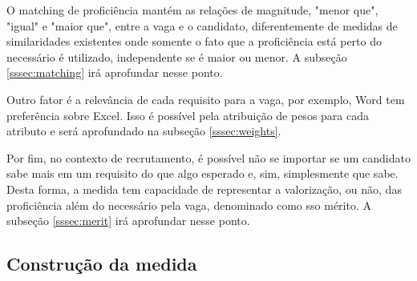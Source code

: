 \documentclass[preprint,12pt]{elsarticle}
\begin{document}
O matching de proficiência mantém as relações de magnitude, "menor que", "igual" e "maior que", entre a vaga e o candidato, diferentemente de medidas de similaridades existentes onde somente o fato que a proficiência está perto do necessário é utilizado, independente se é maior ou menor. A subseção \ref{sssec:matching} irá aprofundar nesse ponto.

Outro fator é a relevância de cada requisito para a vaga, por exemplo, Word tem preferência sobre Excel. Isso é possível pela atribuição de pesos para cada atributo e será aprofundado na subseção \ref{sssec:weights}.

Por fim, no contexto de recrutamento, é possível não se importar se um candidato sabe mais em um requisito do que algo esperado e, sim, simplesmente que sabe. Desta forma, a medida tem capacidade de representar a valorização, ou não, das proficiência além do necessário pela vaga, denominado como sso mérito. A subseção \ref{sssec:merit} irá aprofundar nesse ponto.





\subsection{Construção da medida}

\end{document}
